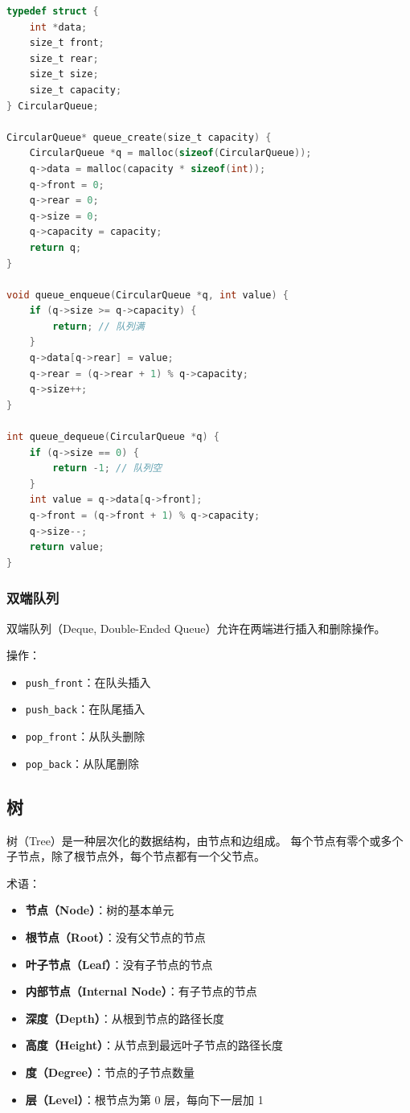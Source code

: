 \begin{lstlisting}[language=C, caption={循环队列实现}]
typedef struct {
    int *data;
    size_t front;
    size_t rear;
    size_t size;
    size_t capacity;
} CircularQueue;

CircularQueue* queue_create(size_t capacity) {
    CircularQueue *q = malloc(sizeof(CircularQueue));
    q->data = malloc(capacity * sizeof(int));
    q->front = 0;
    q->rear = 0;
    q->size = 0;
    q->capacity = capacity;
    return q;
}

void queue_enqueue(CircularQueue *q, int value) {
    if (q->size >= q->capacity) {
        return; // 队列满
    }
    q->data[q->rear] = value;
    q->rear = (q->rear + 1) % q->capacity;
    q->size++;
}

int queue_dequeue(CircularQueue *q) {
    if (q->size == 0) {
        return -1; // 队列空
    }
    int value = q->data[q->front];
    q->front = (q->front + 1) % q->capacity;
    q->size--;
    return value;
}
\end{lstlisting}

\subsubsection{双端队列}

双端队列（Deque, Double-Ended Queue）允许在两端进行插入和删除操作。

操作：
\begin{itemize}
  \item \texttt{push\_front}：在队头插入
  \item \texttt{push\_back}：在队尾插入
  \item \texttt{pop\_front}：从队头删除
  \item \texttt{pop\_back}：从队尾删除
\end{itemize}

\subsection{树}


树（Tree）是一种层次化的数据结构，由节点和边组成。
每个节点有零个或多个子节点，除了根节点外，每个节点都有一个父节点。

术语：
\begin{itemize}
  \item \textbf{节点（Node）}：树的基本单元
  \item \textbf{根节点（Root）}：没有父节点的节点
  \item \textbf{叶子节点（Leaf）}：没有子节点的节点
  \item \textbf{内部节点（Internal Node）}：有子节点的节点
  \item \textbf{深度（Depth）}：从根到节点的路径长度
  \item \textbf{高度（Height）}：从节点到最远叶子节点的路径长度
  \item \textbf{度（Degree）}：节点的子节点数量
  \item \textbf{层（Level）}：根节点为第 0 层，每向下一层加 1
\end{itemize}

